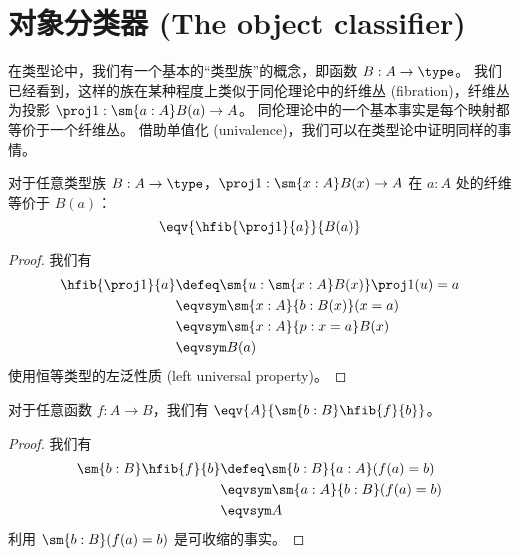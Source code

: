 %

\section{对象分类器 (The object classifier)}
\label{sec:object-classification}

在类型论中，我们有一个基本的“类型族”的概念，即函数 $B:A\to\type$。
我们已经看到，这样的族在某种程度上类似于同伦理论中的纤维丛 (fibration)，纤维丛为投影 $\proj1:\sm{a:A} B(a) \to A$。
同伦理论中的一个基本事实是每个映射都等价于一个纤维丛。
借助单值化 (univalence)，我们可以在类型论中证明同样的事情。

\begin{lem}\label{thm:fiber-of-a-fibration}
对于任意类型族 $B:A\to\type$，$\proj1:\sm{x:A} B(x) \to A$ 在 $a:A$ 处的纤维等价于 $B(a)$：
\[ \eqv{\hfib{\proj1}{a}}{B(a)} \]
\end{lem}
\begin{proof}
  我们有
  \begin{align*}
    \hfib{\proj1}{a} &\defeq \sm{u:\sm{x:A} B(x)} \proj1(u)=a\\
    &\eqvsym \sm{x:A}{b:B(x)} (x=a)\\
    &\eqvsym \sm{x:A}{p:x=a} B(x)\\
    &\eqvsym B(a)
  \end{align*}
  使用恒等类型的左泛性质 (left universal property)。
\end{proof}

\begin{lem}\label{thm:total-space-of-the-fibers}
对于任意函数 $f:A\to B$，我们有 $\eqv{A}{\sm{b:B}\hfib{f}{b}}$。
\end{lem}
\begin{proof}
  我们有
  \begin{align*}
    \sm{b:B}\hfib{f}{b} &\defeq \sm{b:B}{a:A} (f(a)=b)\\
    &\eqvsym \sm{a:A}{b:B} (f(a)=b)\\
    &\eqvsym A
  \end{align*}
  利用 $\sm{b:B} (f(a)=b)$ 是可收缩的事实。
\end{proof}

